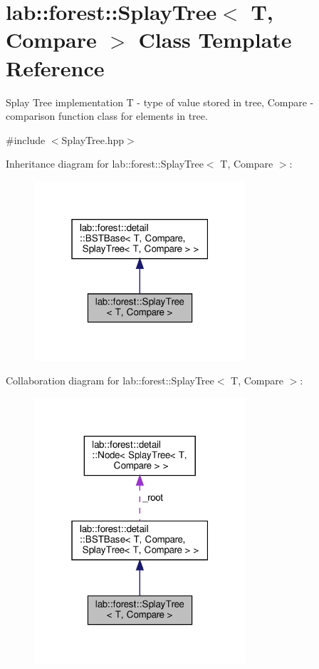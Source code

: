 \hypertarget{classlab_1_1forest_1_1SplayTree}{}\section{lab\+:\+:forest\+:\+:Splay\+Tree$<$ T, Compare $>$ Class Template Reference}
\label{classlab_1_1forest_1_1SplayTree}


Splay Tree implementation T -\/ type of value stored in tree, Compare -\/ comparison function class for elements in tree.  




{\ttfamily \#include $<$Splay\+Tree.\+hpp$>$}



Inheritance diagram for lab\+:\+:forest\+:\+:Splay\+Tree$<$ T, Compare $>$\+:
\nopagebreak
\begin{figure}[H]
\begin{center}
\leavevmode
\includegraphics[width=223pt]{classlab_1_1forest_1_1SplayTree__inherit__graph}
\end{center}
\end{figure}


Collaboration diagram for lab\+:\+:forest\+:\+:Splay\+Tree$<$ T, Compare $>$\+:
\nopagebreak
\begin{figure}[H]
\begin{center}
\leavevmode
\includegraphics[width=223pt]{classlab_1_1forest_1_1SplayTree__coll__graph}
\end{center}
\end{figure}
